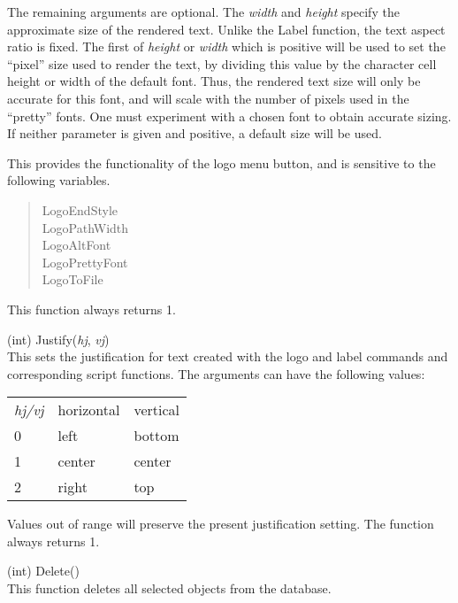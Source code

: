 \begin{description}
The remaining arguments are optional.  The {\it width} and {\it
height} specify the approximate size of the rendered text.  Unlike the
{\vt Label} function, the text aspect ratio is fixed.  The first of
{\it height} or {\it width} which is positive will be used to set the
``pixel'' size used to render the text, by dividing this value by the
character cell height or width of the default font.  Thus, the
rendered text size will only be accurate for this font, and will scale
with the number of pixels used in the ``pretty'' fonts.  One must
experiment with a chosen font to obtain accurate sizing.  If neither
parameter is given and positive, a default size will be used.

This provides the functionality of the {\cb logo} menu button, and is
sensitive to the following variables.

\begin{quote}\et
 LogoEndStyle\\
 LogoPathWidth\\
 LogoAltFont\\
 LogoPrettyFont\\
 LogoToFile
\end{quote}

This function always returns 1.

\item{(int) \vt Justify({\it hj\/}, {\it vj\/})}\\
This sets the justification for text created with the {\cb logo} and
{\cb label} commands and corresponding script functions.  The
arguments can have the following values:

\begin{tabular}{lll}
\it hj/vj & horizontal & vertical\\
0 & left & bottom\\
1 & center & center\\
2 & right & top\\
\end{tabular}

Values out of range will preserve the present justification setting.
The function always returns 1.

\item{(int) \vt Delete()}\\
This function deletes all selected objects from the database.


\end{description}

